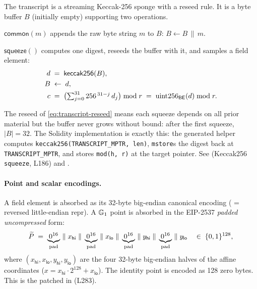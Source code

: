 The transcript is a streaming Keccak-256 sponge with a reseed rule. It is a
byte buffer $B$ (initially empty) supporting two operations.

\begin{definition}
\label{def:common}
$\mathsf{common}(m)$ appends the raw byte string $m$ to $B$:
$B \leftarrow B \,\|\, m$.
\end{definition}

\begin{definition}
\label{def:squeeze}
$\mathsf{squeeze}()$ computes one digest, reseeds the buffer with it, and
samples a field element:
\begin{align}
  d &\;=\; \mathsf{keccak256}(B), \label{eq:transcript-digest}\\
  B &\;\leftarrow\; d, \label{eq:transcript-reseed}\\
  c &\;=\; \bigl(\textstyle\sum_{j=0}^{31} 256^{\,31-j}\, d_j\bigr) \bmod r
     \;=\; \mathrm{uint256}_{\mathsf{BE}}(d) \bmod r. \label{eq:transcript-squeeze}
\end{align}
\end{definition}

\begin{remark}
The reseed of \eqref{eq:transcript-reseed} means each squeeze depends on all
prior material but the buffer never grows without bound: after the first
squeeze, $|B| = 32$. The Solidity implementation is exactly this: the
generated  helper computes
\texttt{keccak256(TRANSCRIPT\_\allowbreak{}MPTR, len)}, \texttt{mstore}s the digest back
at \texttt{TRANSCRIPT\_\allowbreak{}MPTR}, and stores \texttt{mod(h, r)} at the target
pointer. See  (Keccak256 \texttt{squeeze},
L186) and .
\end{remark}

\paragraph{Point and scalar encodings.}
A field element is absorbed as its 32-byte big-endian canonical encoding
( = reversed little-endian repr). A $\mathbb{G}_1$ point is
absorbed in the EIP-2537 \emph{padded uncompressed} form:
\begin{equation}
  \widetilde{P} \;=\; \underbrace{0^{16}}_{\text{pad}}\, \| \; x_{\mathsf{hi}} \;\|\;
  \underbrace{0^{16}}_{\text{pad}}\, \| \; x_{\mathsf{lo}} \;\|\;
  \underbrace{0^{16}}_{\text{pad}}\, \| \; y_{\mathsf{hi}} \;\|\;
  \underbrace{0^{16}}_{\text{pad}}\, \| \; y_{\mathsf{lo}}
  \quad\in\; \{0,1\}^{128},
  \label{eq:g1-encoding}
\end{equation}
where $(x_{\mathsf{hi}}, x_{\mathsf{lo}}, y_{\mathsf{hi}}, y_{\mathsf{lo}})$
are the four 32-byte big-endian halves of the affine coordinates
($x = x_{\mathsf{hi}} \cdot 2^{128} + x_{\mathsf{lo}}$). The identity point
is encoded as 128 zero bytes. This is the patched
 in
 (L283).

